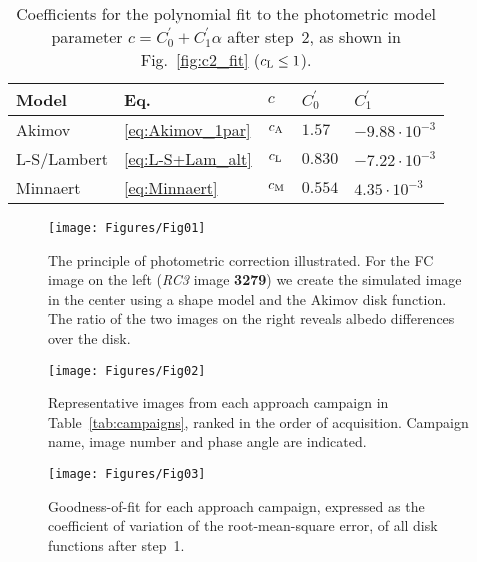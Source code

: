 \documentclass[3p,authoryear]{elsarticle}
\begin{document}

\begin{table}
\centering
\caption{Coefficients for the polynomial fit to the photometric model parameter $c = C_0^\prime + C_1^\prime \alpha$ after step~2, as shown in Fig.~\ref{fig:c2_fit} ($c_{\rm L} \leq 1$).}
\vspace{5mm}
\begin{tabular}{lllll}
\hline
Model & Eq. & $c$ & $C_0^\prime$ & $C_1^\prime$ \\
\hline
Akimov & \ref{eq:Akimov_1par} & $c_{\rm A}$ & $1.57$ & $-9.88 \cdot 10^{-3}$ \\
L-S/Lambert & \ref{eq:L-S+Lam_alt} & $c_{\rm L}$ & $0.830$ & $-7.22 \cdot 10^{-3}$ \\
Minnaert & \ref{eq:Minnaert} & $c_{\rm M}$ & $0.554$ & $4.35 \cdot 10^{-3}$ \\
\hline
\end{tabular}
\label{tab:c2_coef}
\end{table}

\newpage
\clearpage

\begin{figure}
\centering
\texttt{[image: Figures/Fig01]}
\caption{The principle of photometric correction illustrated. For the FC image on the left ({\it RC3} image {\bf 3279}) we create the simulated image in the center using a shape model and the Akimov disk function. The ratio of the two images on the right reveals albedo differences over the disk.}
\label{fig:model_image}
\end{figure}


\begin{figure}
\centering
\texttt{[image: Figures/Fig02]}
\caption{Representative images from each approach campaign in Table~\ref{tab:campaigns}, ranked in the order of acquisition. Campaign name, image number and phase angle are indicated.}
\label{fig:overview}
\end{figure}


\begin{figure}
\centering
\texttt{[image: Figures/Fig03]}
\caption{Goodness-of-fit for each approach campaign, expressed as the coefficient of variation of the root-mean-square error, of all disk functions after step~1.}
\label{fig:goodness_of_fit_step1}
\end{figure}
\end{document}
